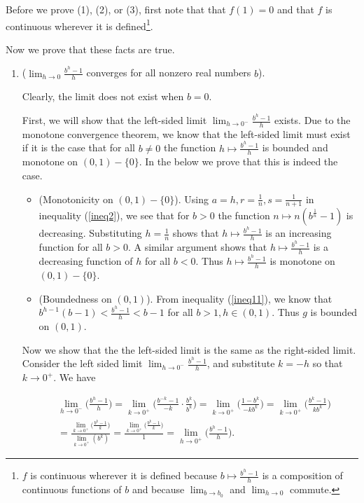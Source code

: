 Before we prove (1), (2), or (3), first note that that $f(1) = 0$ and that $f$ is continuous wherever it is defined\footnote{$f$ is continuous wherever it is defined because $b \mapsto \frac{b^h - 1}{h}$ is a composition of continuous functions of $b$ and because $\lim_{b \rightarrow b_0}$ and $\lim_{h \rightarrow 0}$ commute.}. 

\vspace{.25cm}

Now we prove that these facts are true.

\begin{enumerate}
    \item ($\lim_{h \rightarrow 0} \frac{b^h - 1}{h}$ converges for all nonzero real numbers $b$).
    
    Clearly, the limit does not exist when $b = 0$. 
        
    First, we will show that the left-sided limit $\lim_{h \rightarrow 0^-} \frac{b^h - 1}{h}$ exists. Due to the monotone convergence theorem, we know that the left-sided limit must exist if it is the case that for all $b \neq 0$ the function $h \mapsto \frac{b^h - 1}{h}$ is bounded and monotone on $(0, 1) - \{0\}$. In the below we prove that this is indeed the case.
    
    \begin{itemize}
        \item (Monotonicity on $(0, 1) - \{0\}$). Using $a = h, r = \frac{1}{n}, s = \frac{1}{n + 1}$ in inequality (\ref{ineq2}), we see that for $b > 0$ the function $n \mapsto n(b^{\frac{1}{n}} - 1)$ is decreasing. Substituting $h = \frac{1}{n}$ shows that $h \mapsto \frac{b^h - 1}{h}$ is an increasing function for all $b > 0$. A similar argument shows that $h \mapsto \frac{b^h - 1}{h}$ is a decreasing function of $h$ for all $b < 0$. Thus $h \mapsto \frac{b^h - 1}{h}$ is monotone on $(0, 1) - \{0\}$.
        \item (Boundedness on $(0, 1)$). From inequality (\ref{ineq11}), we know that $b^{h - 1}(b - 1) < \frac{b^h - 1}{h} < b - 1$ for all $b > 1, h \in (0, 1)$. Thus $g$ is bounded on $(0, 1)$.
    \end{itemize}
    
    Now we show that the the left-sided limit is the same as the right-sided limit. Consider the left sided limit $\lim_{h \rightarrow 0^-} \frac{b^h - 1}{h}$, and substitute $k = -h$ so that $k \rightarrow 0^+$. We have
    
    \begin{align*}
        &\lim_{h \rightarrow 0^-} \Big( \frac{b^h - 1}{h} \Big) 
        = \lim_{k \rightarrow 0^+} \Big( \frac{b^{-k} - 1}{-k} \cdot \frac{b^k}{b^k} \Big) 
        = \lim_{k \rightarrow 0^+} \Big( \frac{1 - b^k}{-kb^k} \Big)
        = \lim_{k \rightarrow 0^+} \Big( \frac{b^k - 1}{kb^k} \Big) \\ 
        &= \frac{\lim_{k \rightarrow 0^+} \Big( \frac{b^k - 1}{k} \Big)}{\lim_{k \rightarrow 0^+} (b^k)}
        = \frac{\lim_{k \rightarrow 0^+} \Big( \frac{b^k - 1}{k} \Big)}{1}
        = \lim_{h \rightarrow 0^+} \Big( \frac{b^h - 1}{h} \Big).
    \end{align*}
    

\end{enumerate}
